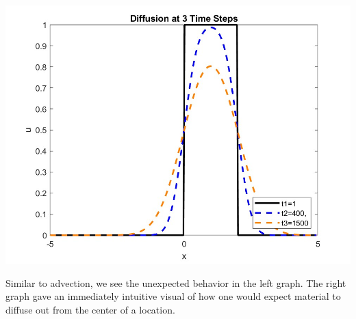 \documentclass{article}
\begin{document}
    \begin{minipage}[t]{.49\textwidth}
    \centering
    \includegraphics[scale=0.20]{Step1_Hat_Diffusion_3_timestamps.jpg}
    \label{fig:Hat-Diffusion}
    \end{minipage}
\vspace{.5cm}

Similar to advection, we see the unexpected behavior in the left graph.  The right graph gave an immediately intuitive visual of how one would expect material to diffuse out from the center of a location.\\
\end{document}
